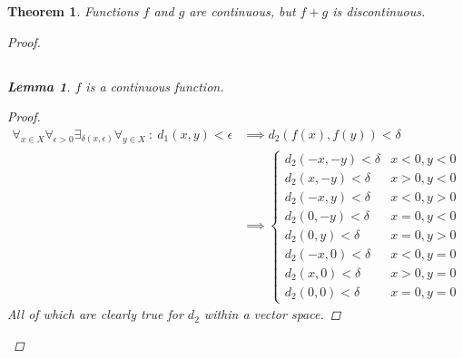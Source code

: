\documentclass[]{article}
\newcommand{\st}{\ : \ }
\newtheorem{theorem}{Theorem}
\newtheorem{lemma}{Lemma}
\begin{document}
\begin{theorem}
    Functions $f$ and $g$ are continuous, but $f + g$ is discontinuous.
    \begin{proof}
        
        \subsection{}
        \begin{lemma}
            $f$ is a continuous function.
            \begin{proof}
                \begin{align*}
                    \forall_{x \in X} \forall_{\epsilon > 0} \exists_{\delta(x, \epsilon)} \forall_{y \in X} \st d_1(x,y) < \epsilon
                        &\implies d_2(f(x), f(y)) < \delta\\
                        &\implies 
                        \begin{cases}
                            d_2(-x, -y) < \delta &x < 0, y < 0\\
                            d_2(x, -y) < \delta & x > 0, y < 0\\
                            d_2(-x, y) < \delta & x < 0, y > 0\\
                            d_2(0, -y) < \delta & x= 0, y <0\\
                            d_2(0, y) < \delta & x = 0, y > 0\\
                            d_2(-x, 0) < \delta & x < 0, y = 0\\
                            d_2(x, 0) < \delta & x > 0, y = 0\\
                            d_2(0, 0) < \delta & x = 0, y = 0
                        \end{cases}
                \end{align*}
                All of which are clearly true for $d_2$ within a vector space.
            \end{proof}
        \end{lemma}


\end{proof}
\end{theorem}
\end{document}
